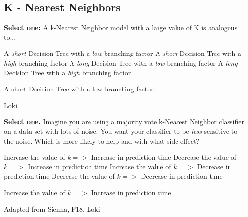 \newpage
\subsection{K - Nearest Neighbors}
\begin{questions}

    \question[1] \textbf{Select one:} A k-Nearest Neighbor model with a large value of K is analogous to...
    \begin{checkboxes}
     \choice A \textit{short} Decision Tree with a \textit{low} branching factor
     \choice A \textit{short} Decision Tree with a \textit{high} branching factor
     \choice A \textit{long} Decision Tree with a \textit{low} branching factor
     \choice A \textit{long} Decision Tree with a \textit{high} branching factor
    \end{checkboxes}
    
    \begin{soln}
    A short Decision Tree with a low branching factor
    \end{soln}
    
    \begin{qauthor}
    Loki
    \end{qauthor}
    
    \question[1] \textbf{Select one.} Imagine you are using a majority vote k-Nearest Neighbor classifier on a data set with lots of noise. You want your classifier to be \textit{less} sensitive to the noise. Which is more likely to help and with what side-effect? 
    \begin{checkboxes}
        \choice Increase the value of $k =>$ Increase in prediction time
        \choice Decrease the value of $k =>$ Increase in prediction time
        \choice Increase the value of $k =>$ Decrease in prediction time
        \choice Decrease the value of $k =>$ Decrease in prediction time
    \end{checkboxes}
    
    \begin{soln}
    Increase the value of $k =>$ Increase in prediction time
    \end{soln}
    
    \begin{qauthor}
    Adapted from Sienna, F18. Loki
    \end{qauthor}
    

\end{questions}
